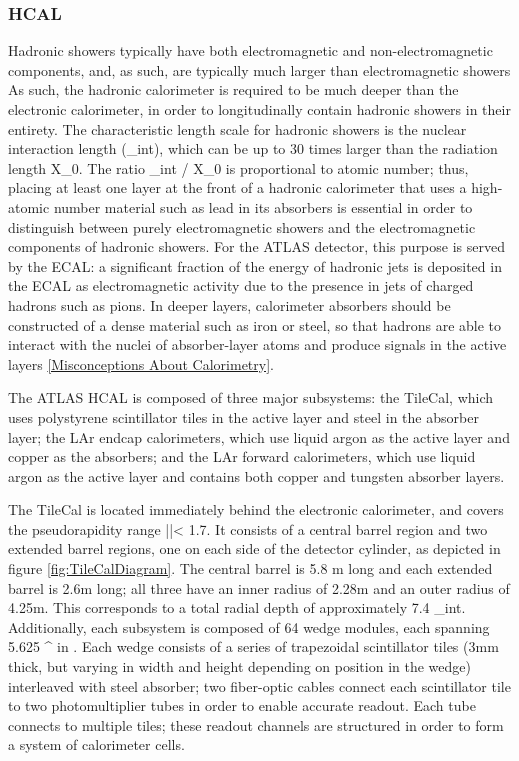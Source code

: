 \subsubsection{HCAL} \label{sec:HCAL} 

Hadronic showers typically have both electromagnetic and non-electromagnetic components, and, as such, are typically much larger than electromagnetic showers  As such, the hadronic calorimeter is required to be much deeper than the electronic calorimeter, in order to longitudinally contain hadronic showers in their entirety. The characteristic length scale for hadronic showers is the nuclear interaction length (\lambda\_{int}), which can be up to 30 times larger than the radiation length X_0. The ratio \lambda\_{int} / X_0 is proportional to atomic number; thus, placing at least one layer at the front of a hadronic calorimeter that uses a high-atomic number material such as lead in its absorbers is essential in order to distinguish between purely electromagnetic showers and the electromagnetic components of hadronic showers. For the ATLAS detector, this purpose is served by the ECAL: a significant fraction of the energy of hadronic jets is deposited in the ECAL as electromagnetic activity due to the presence in jets of charged hadrons such as pions. In deeper layers, calorimeter absorbers should be constructed of a dense material such as iron or steel, so that hadrons are able to interact with the nuclei of absorber-layer atoms and produce signals in the active layers \ref{Misconceptions About Calorimetry}.  

The ATLAS HCAL is composed of three major subsystems: the TileCal, which uses polystyrene scintillator tiles in the active layer and steel in the absorber layer; the LAr endcap calorimeters, which use liquid argon as the active layer and copper as the absorbers; and the LAr forward calorimeters, which use liquid argon as the active layer and contains both copper and tungsten absorber layers.

The TileCal is located immediately behind the electronic calorimeter, and covers the pseudorapidity range |\eta |< 1.7. It consists of a central barrel region and two extended barrel regions, one on each side of the detector cylinder, as depicted in figure \ref{fig:TileCalDiagram}. The central barrel is 5.8 m long and each extended barrel is 2.6m long; all three have an inner radius of 2.28m and an outer radius of 4.25m. This corresponds to a total radial depth of approximately 7.4 \lambda\_{int}. Additionally, each subsystem is composed of 64 wedge modules, each spanning 5.625 {^\deg} in \phi . Each wedge consists of a series of trapezoidal scintillator tiles (3mm thick, but varying in width and height depending on position in the wedge) interleaved with steel absorber; two fiber-optic cables connect each scintillator tile to two photomultiplier tubes in order to enable accurate readout. Each tube connects to multiple tiles; these readout channels are structured in order to form a system of calorimeter cells. 

